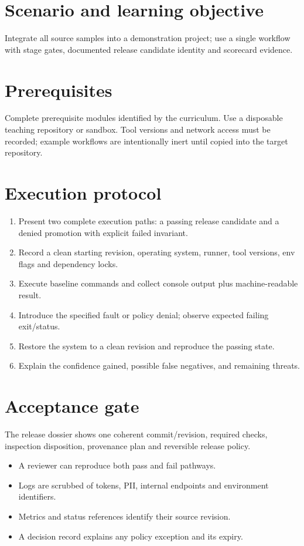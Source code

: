 \documentclass[11pt,letterpaper]{article}
\begin{document}
\makedoctitle
\makedocsummary
\tableofcontents
\clearpage
\section{Scenario and learning objective}
Integrate all source samples into a demonstration project; use a single workflow with stage gates, documented release candidate identity and scorecard evidence.

\section{Prerequisites}
Complete prerequisite modules identified by the curriculum. Use a disposable teaching repository or sandbox. Tool versions and network access must be recorded; example workflows are intentionally inert until copied into the target repository.

\section{Execution protocol}
\begin{enumerate}
\item Present two complete execution paths: a passing release candidate and a denied promotion with explicit failed invariant.
\item Record a clean starting revision, operating system, runner, tool versions, env flags and dependency locks.
\item Execute baseline commands and collect console output plus machine-readable result.
\item Introduce the specified fault or policy denial; observe expected failing exit/status.
\item Restore the system to a clean revision and reproduce the passing state.
\item Explain the confidence gained, possible false negatives, and remaining threats.
\end{enumerate}
\section{Acceptance gate}
The release dossier shows one coherent commit/revision, required checks, inspection disposition, provenance plan and reversible release policy.

\begin{itemize}
\item A reviewer can reproduce both pass and fail pathways.
\item Logs are scrubbed of tokens, PII, internal endpoints and environment identifiers.
\item Metrics and status references identify their source revision.
\item A decision record explains any policy exception and its expiry.
\end{itemize}
\end{document}

